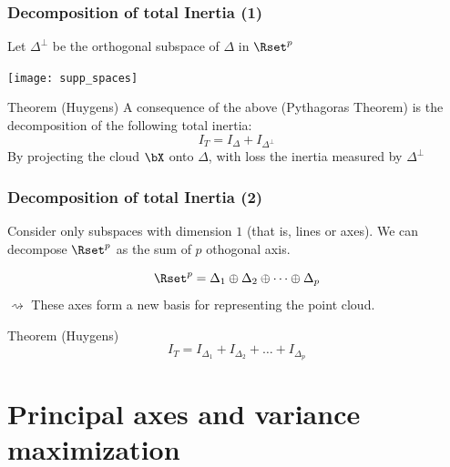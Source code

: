 \documentclass{beamer}\usepackage[]{graphicx}\usepackage[]{color}
\begin{document}
\begin{frame}
  \frametitle{Decomposition of total Inertia (1)}
  
  Let $\Delta^\bot$ be the orthogonal subspace of $\Delta$ in $\Rset^p$

  \texttt{[image: supp\_spaces]}

  \begin{block}{Theorem (Huygens)}
    A consequence of the above (Pythagoras Theorem) is the decomposition of the following total inertia:
      \begin{equation*}
        I_T = I_{\Delta} + I_{\Delta^\bot}
      \end{equation*}
    \alert{By projecting the cloud $\bX$ onto $\Delta$, with loss the inertia measured by $\Delta^\bot$}
    \end{block}
        
\end{frame}

\begin{frame}
  \frametitle{Decomposition of total Inertia (2)}
  
  Consider only subspaces with dimension $1$ (that is, lines or axes). We can decompose $\Rset^p$ as the sum of $p$ othogonal axis. 
  
  \begin{equation*}
    \Rset^p = \Delta_1 \oplus \Delta_2 \oplus \dots \oplus \Delta_p
  \end{equation*}
  \alert{$\rightsquigarrow$ These axes form a new basis for representing the point cloud.}

  \begin{block}{Theorem (Huygens)}
    \begin{equation*}
      I_{T} = I_{\Delta_1} + I_{\Delta_2} + \dots + I_{\Delta_p}
    \end{equation*}
  \end{block}
  
\end{frame}


\section{Principal axes and variance maximization}
\end{document}

